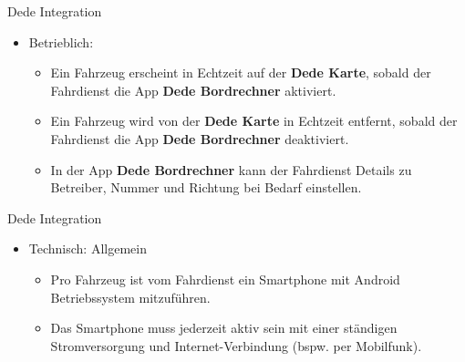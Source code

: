 
\begin{frame}{Dede Integration}
  \begin{itemize}
  \item Betrieblich:
    \begin{itemize}
    \item Ein Fahrzeug erscheint in Echtzeit auf der \textbf{Dede Karte}, sobald der Fahrdienst die App \textbf{Dede Bordrechner} aktiviert.
    \item Ein Fahrzeug wird von der \textbf{Dede Karte} in Echtzeit entfernt, sobald der Fahrdienst die App \textbf{Dede Bordrechner} deaktiviert.
      \item In der App \textbf{Dede Bordrechner} kann der Fahrdienst Details zu Betreiber, Nummer und Richtung bei Bedarf einstellen.
    \end{itemize}
  \end{itemize}
\end{frame}

\begin{frame}{Dede Integration}
  \begin{itemize}
  \item Technisch: Allgemein
    \begin{itemize}
    \item Pro Fahrzeug ist vom Fahrdienst ein Smartphone mit Android Betriebssystem mitzuführen.
    \item Das Smartphone muss jederzeit aktiv sein mit einer ständigen Stromversorgung und Internet-Verbindung (bspw. per Mobilfunk).
    \end{itemize}
  \end{itemize}
\end{frame}

